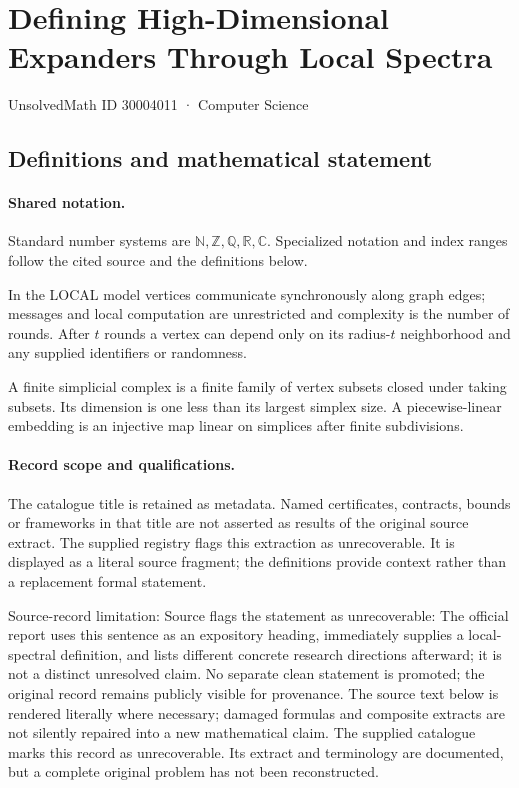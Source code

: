 \documentclass[11pt]{article}
\begin{document}
\setcounter{section}{30004010}
\section{Defining High-Dimensional Expanders Through Local Spectra}\label{30004011}
{\small\sffamily UnsolvedMath ID 30004011 · Computer Science}
\subsection{Definitions and mathematical statement}

\paragraph{Shared notation.}Standard number systems are $\mathbb N,\mathbb Z,\mathbb Q,\mathbb R,\mathbb C$. Specialized notation and index ranges follow the cited source and the definitions below.


In the LOCAL model vertices communicate synchronously along graph edges; messages and local computation are unrestricted and complexity is the number of rounds. After $t$ rounds a vertex can depend only on its radius-$t$ neighborhood and any supplied identifiers or randomness.

A finite simplicial complex is a finite family of vertex subsets closed under taking subsets. Its dimension is one less than its largest simplex size. A piecewise-linear embedding is an injective map linear on simplices after finite subdivisions.
\paragraph{Record scope and qualifications.}
The catalogue title is retained as metadata. Named certificates, contracts, bounds or frameworks in that title are not asserted as results of the original source extract.
The supplied registry flags this extraction as unrecoverable. It is displayed as a literal source fragment; the definitions provide context rather than a replacement formal statement.

Source-record limitation: Source flags the statement as unrecoverable: The official report uses this sentence as an expository heading, immediately supplies a local-spectral definition, and lists different concrete research directions afterward; it is not a distinct unresolved claim. No separate clean statement is promoted; the original record remains publicly visible for provenance.
The source text below is rendered literally where necessary; damaged formulas and composite extracts are not silently repaired into a new mathematical claim.
The supplied catalogue marks this record as unrecoverable. Its extract and terminology are documented, but a complete original problem has not been reconstructed.
\end{document}
